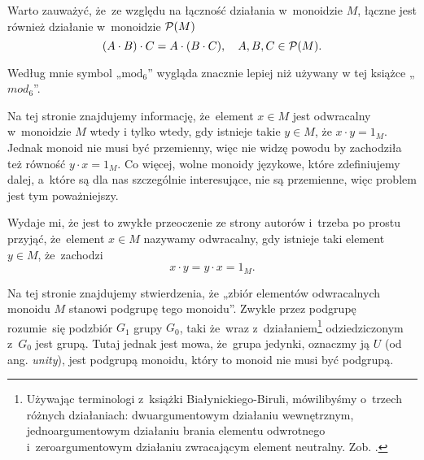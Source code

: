 \documentclass[a4paper,11pt]{article}
\begin{document}
\start {} Warto zauważyć, że~ze względu na łączność działania
w~monoidzie $M$, łączne jest również działanie w~monoidzie $\mathcal{P}( M )$
\begin{equation}
  \label{eq:Forys-Forys-aaa}
  ( A \cdot B ) \cdot C = A \cdot ( B \cdot C ), \quad
  A, B, C \in \mathcal{P}( M ).
\end{equation}

\vspace{\spaceFour}





\start {} Według mnie symbol „$\textrm{mod}_{ 6 }$” wygląda
znacznie lepiej niż używany w tej książce „$mod_{ 6 }$”.

\vspace{\spaceFour}





\start {} Na tej stronie znajdujemy informację, że~element
$x \in M$ jest odwracalny w~monoidzie $M$ wtedy i tylko wtedy, gdy
istnieje takie $y \in M$, że $x \cdot y = 1_{ M }$. Jednak monoid nie
musi być przemienny, więc nie widzę powodu by zachodziła też równość
$y \cdot x = 1_{ M }$. Co więcej, wolne monoidy językowe, które
zdefiniujemy dalej, a~które są dla nas szczególnie interesujące, nie
są przemienne, więc problem jest tym poważniejszy.

Wydaje mi, że jest to zwykłe przeoczenie ze strony autorów i~trzeba po
prostu przyjąć, że~element $x \in M$ nazywamy odwracalny, gdy istnieje
taki element $y \in M$, że~zachodzi
\begin{equation}
  \label{eq:Forys-Forys-01}
  x \cdot y = y \cdot x = 1_{ M }.
\end{equation}

\vspace{\spaceFour}





\start {} Na tej stronie znajdujemy stwierdzenia, że „zbiór
elementów odwracalnych monoidu $M$ stanowi podgrupę tego monoidu”.
Zwykle przez podgrupę rozumie~się podzbiór $G_{ 1 }$ grupy $G_{ 0 }$,
taki że~wraz z~działaniem\footnote{Używając terminologi z~książki
  Białynickiego-Biruli, mówilibyśmy o~trzech różnych działaniach:
  dwuargumentowym działaniu wewnętrznym, jednoargumentowym działaniu brania
  elementu odwrotnego i~zeroargumentowym działaniu zwracającym element
  neutralny. Zob. \cite{BialynickiBirulaZarysAlgebry1987}.} odziedziczonym
z~$G_{ 0 }$ jest grupą. Tutaj
jednak jest mowa, że~grupa jedynki, oznaczmy ją $U$ (od ang.
\textit{unity}), jest podgrupą monoidu, który to monoid nie musi być
podgrupą.
\end{document}
